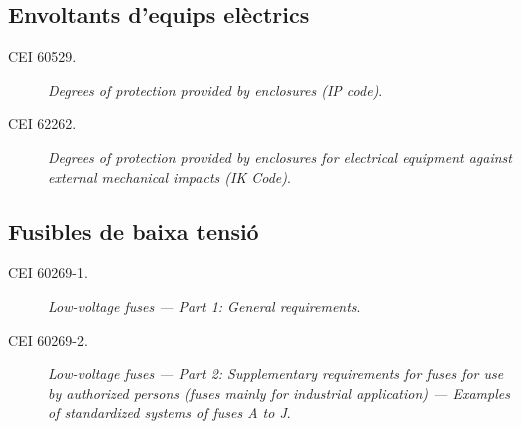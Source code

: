 \subsection*{Envoltants d'equips elèctrics}
\begin{description}
	\item [\hspace{5mm}CEI 60529.] \textit{Degrees of protection provided by enclosures (IP code)}.
	\item [\hspace{5mm}CEI 62262.] \textit{Degrees of protection provided by enclosures for electrical equipment against external mechanical impacts (IK Code)}.
\end{description}

\subsection*{Fusibles de baixa tensió}
\begin{description}
	\item [\hspace{5mm}CEI 60269-1.] \textit{Low-voltage fuses --- Part 1: General requirements}.
	\item [\hspace{5mm}CEI 60269-2.] \textit{Low-voltage fuses --- Part 2: Supplementary requirements for fuses for use by authorized persons
		(fuses mainly for industrial application) ---  Examples of standardized systems of fuses A to J}.
\end{description}

